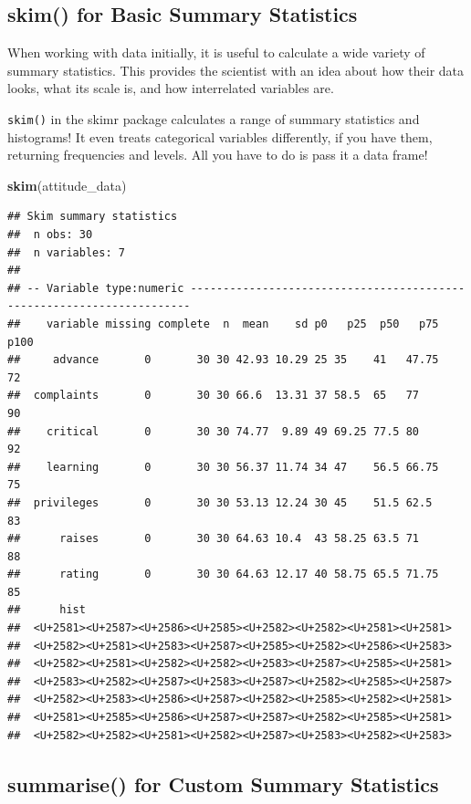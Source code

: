 \documentclass[]{book}
\newenvironment{Shaded}{\begin{snugshade}}{\end{snugshade}}
\newcommand{\KeywordTok}[1]{\textcolor[rgb]{0.13,0.29,0.53}{\textbf{#1}}}
\newcommand{\NormalTok}[1]{#1}
\theoremstyle{definition}
\theoremstyle{definition}
\theoremstyle{definition}
\theoremstyle{remark}
\begin{document}
\hypertarget{skim-for-basic-summary-statistics}{%
\subsection{skim() for Basic Summary Statistics}\label{skim-for-basic-summary-statistics}}

When working with data initially, it is useful to calculate a wide variety of summary statistics. This provides the scientist with an idea about how their data looks, what its scale is, and how interrelated variables are.

\texttt{skim()} in the skimr package calculates a range of summary statistics and histograms! It even treats categorical variables differently, if you have them, returning frequencies and levels. All you have to do is pass it a data frame!

\begin{Shaded}
\begin{Highlighting}[]
\KeywordTok{skim}\NormalTok{(attitude_data)}
\end{Highlighting}
\end{Shaded}

\begin{verbatim}
## Skim summary statistics
##  n obs: 30 
##  n variables: 7 
## 
## -- Variable type:numeric ----------------------------------------------------------------------
##    variable missing complete  n  mean    sd p0   p25  p50   p75 p100
##     advance       0       30 30 42.93 10.29 25 35    41   47.75   72
##  complaints       0       30 30 66.6  13.31 37 58.5  65   77      90
##    critical       0       30 30 74.77  9.89 49 69.25 77.5 80      92
##    learning       0       30 30 56.37 11.74 34 47    56.5 66.75   75
##  privileges       0       30 30 53.13 12.24 30 45    51.5 62.5    83
##      raises       0       30 30 64.63 10.4  43 58.25 63.5 71      88
##      rating       0       30 30 64.63 12.17 40 58.75 65.5 71.75   85
##      hist
##  <U+2581><U+2587><U+2586><U+2585><U+2582><U+2582><U+2581><U+2581>
##  <U+2582><U+2581><U+2583><U+2587><U+2585><U+2582><U+2586><U+2583>
##  <U+2582><U+2581><U+2582><U+2582><U+2583><U+2587><U+2585><U+2581>
##  <U+2583><U+2582><U+2587><U+2583><U+2587><U+2582><U+2585><U+2587>
##  <U+2582><U+2583><U+2586><U+2587><U+2582><U+2585><U+2582><U+2581>
##  <U+2581><U+2585><U+2586><U+2587><U+2587><U+2582><U+2585><U+2581>
##  <U+2582><U+2582><U+2581><U+2582><U+2587><U+2583><U+2582><U+2583>
\end{verbatim}

\hypertarget{summarise-for-custom-summary-statistics}{%
\subsection{summarise() for Custom Summary Statistics}\label{summarise-for-custom-summary-statistics}}
\end{document}
